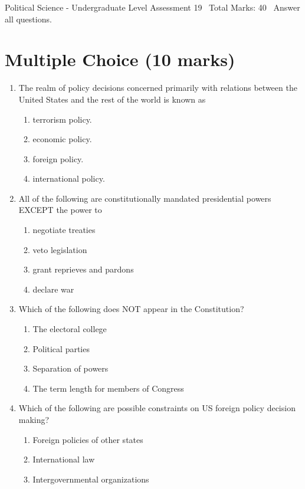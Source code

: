 \documentclass[12pt]{article}
\begin{document}
\begin{center}
Political Science - Undergraduate Level Assessment 19 \
Total Marks: 40 \
Answer all questions.
\end{center}

\section*{Multiple Choice (10 marks)}
\begin{enumerate}[label=\arabic*.]
\item The realm of policy decisions concerned primarily with relations between the United States and the rest of the world is known as
\begin{enumerate}[label=(\alph*)]
    \item terrorism policy.
    \item economic policy.
    \item foreign policy.
    \item international policy.
\end{enumerate}
\item All of the following are constitutionally mandated presidential powers EXCEPT the power to
\begin{enumerate}[label=(\alph*)]
    \item negotiate treaties
    \item veto legislation
    \item grant reprieves and pardons
    \item declare war
\end{enumerate}
\item Which of the following does NOT appear in the Constitution?
\begin{enumerate}[label=(\alph*)]
    \item The electoral college
    \item Political parties
    \item Separation of powers
    \item The term length for members of Congress
\end{enumerate}
\item Which of the following are possible constraints on US foreign policy decision making?
\begin{enumerate}[label=(\alph*)]
    \item Foreign policies of other states
    \item International law
    \item Intergovernmental organizations

\end{enumerate}
\end{enumerate}
\end{document}
